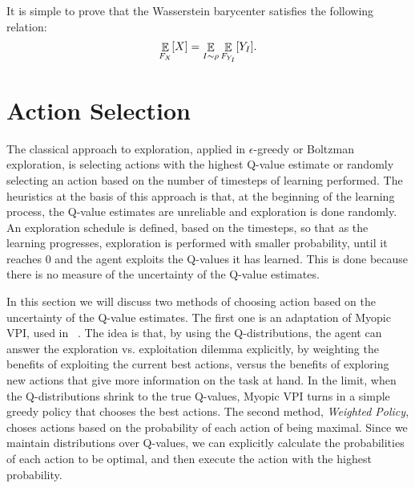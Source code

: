 It is simple to prove that the Wasserstein barycenter satisfies the following relation:
\begin{equation}
	\displaystyle \mathop{\mathbb{E}}_{F_X}[X] = \displaystyle \mathop{\mathbb{E}}_{I \sim \rho} \displaystyle \mathop{\mathbb{E}}_{F_{Y_I}} [Y_I].
\end{equation}

\section{Action Selection} \label{sec:action_selection}
The classical approach to exploration, applied in $\epsilon$-greedy or Boltzman exploration, is selecting actions with the highest Q-value estimate or randomly selecting an action based on the number of timesteps of learning performed. The heuristics at the basis of this approach is that, at the beginning of the learning process, the Q-value estimates are unreliable and exploration is done randomly. An exploration schedule is defined, based on the timesteps, so that as the learning progresses, exploration is performed with smaller probability, until it reaches 0 and the agent exploits the Q-values it has learned. This is done because there is no measure of the uncertainty of the Q-value estimates. \par 
In this section we will discuss two methods of choosing action based on the uncertainty of the Q-value estimates. The first one is an adaptation of Myopic VPI, used in ~\cite{Dearden98bayesianq-learning}. The idea is that, by using the Q-distributions, the agent can answer the exploration vs. exploitation dilemma explicitly, by weighting the benefits of exploiting the current best actions, versus the benefits of exploring new actions that give more information on the task at hand. In the limit, when the Q-distributions shrink to the true Q-values, Myopic VPI turns in a simple greedy policy that chooses the best actions. The second method, \emph{Weighted Policy}\cite{pmlr-v48-deramo16}, choses actions based on the probability of each action of being maximal. Since we maintain distributions over Q-values, we can explicitly calculate the probabilities of each action to be optimal, and then execute the action with the highest probability.
